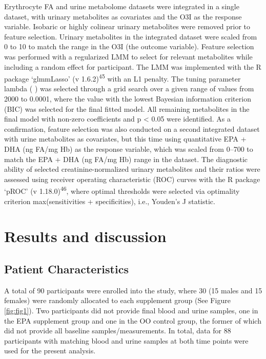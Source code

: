\documentclass[journal=jacsat,manuscript=article]{achemso}
\begin{document}
Erythrocyte FA and urine metabolome datasets were integrated in a single
dataset, with urinary metabolites as covariates and the O3I as the
response variable. Isobaric or highly colinear urinary metabolites were
removed prior to feature selection. Urinary metabolites in the
integrated dataset were scaled from 0 to 10 to match the range in the
O3I (the outcome variable). Feature selection was performed with a
regularized LMM to select for relevant metabolites while including a
random effect for participant. The LMM was implemented with the R
package `glmmLasso' (v 1.6.2)\textsuperscript{45} with an L1 penalty.
The tuning parameter lambda ( ) was selected through a grid search over
a given range of values from 2000 to 0.0001, where the value with the
lowest Bayesian information criterion (BIC) was selected for the final
fitted model. All remaining metabolites in the final model with non-zero
coefficients and p \textless{} 0.05 were identified. As a confirmation,
feature selection was also conducted on a second integrated dataset with
urine metabolites as covariates, but this time using quantitative EPA +
DHA (ng FA/mg Hb) as the response variable, which was scaled from 0--700
to match the EPA + DHA (ng FA/mg Hb) range in the dataset. The
diagnostic ability of selected creatinine-normalized urinary metabolites
and their ratios were assessed using receiver operating characteristic
(ROC) curves with the R package `pROC' (v 1.18.0)\textsuperscript{46},
where optimal thresholds were selected via optimality criterion
max(sensitivities + specificities), i.e., Youden's J statistic.

\section{Results and discussion}\label{results-and-discussion}

\subsection{Patient Characteristics}\label{patient-characteristics}

A total of 90 participants were enrolled into the study, where 30 (15
males and 15 females) were randomly allocated to each supplement group
(See Figure \ref{fig:fig1}). Two participants did not provide final
blood and urine samples, one in the EPA supplement group and one in the
OO control group, the former of which did not provide all baseline
samples/measurements. In total, data for 88 participants with matching
blood and urine samples at both time points were used for the present
analysis.
\end{document}
